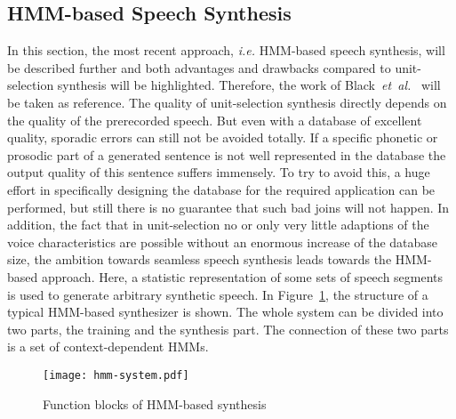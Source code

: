 \subsection{\ac{HMM}-based Speech Synthesis}
\label{subsec:hmmspeech}

In this section, the most recent approach, \textit{i.e.} \ac{HMM}-based speech synthesis, will be described further and both advantages and drawbacks compared to unit-selection synthesis will be highlighted. Therefore, the work of Black~\textit{et~al.}~\cite{black:statistical} will be taken as reference. The quality of unit-selection synthesis directly depends on the quality of the prerecorded speech. But even with a database of excellent quality, sporadic errors can still not be avoided totally. If a specific phonetic or prosodic part of a generated sentence is not well represented in the database the output quality of this sentence suffers immensely. To try to avoid this, a huge effort in specifically designing the database for the required application can be performed, but still there is no guarantee that such bad joins will not happen. In addition, the fact that in unit-selection no or only very little adaptions of the voice characteristics are possible without an enormous increase of the database size, the ambition towards seamless speech synthesis leads towards the \ac{HMM}-based approach. Here, a statistic representation of some sets of speech segments is used to generate arbitrary synthetic speech. In Figure~\ref{fig:hmm}, the structure of a typical \ac{HMM}-based synthesizer is shown. The whole system can be divided into two parts, the training and the synthesis part. The connection of these two parts is a set of context-dependent \acp{HMM}. 

\begin{figure}[h]
	\texttt{[image: hmm-system.pdf]}
	\caption{Function blocks of \ac{HMM}-based synthesis~\cite{black:statistical}}
	\label{fig:hmm}
\end{figure}

